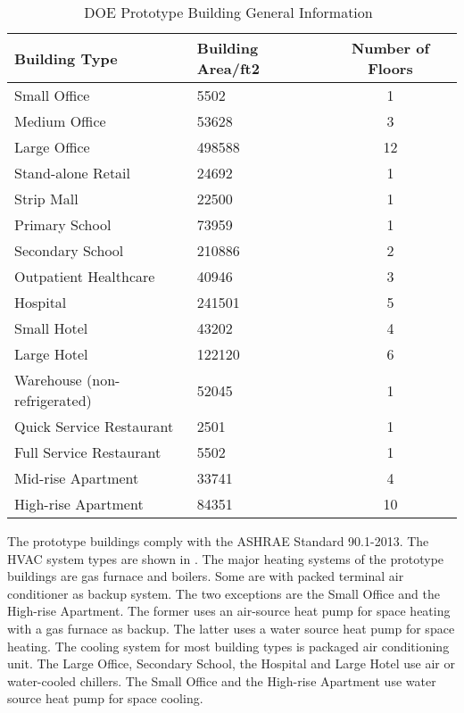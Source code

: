 \begin{table}[h!]
  \centering
  \begin{tabular}{l|l|c}
    \hline
Building Type                & Building Area/ft2 & Number of Floors\\
    \hline
Small Office                 & 5502              & 1\\
Medium Office                & 53628             & 3\\
Large Office                 & 498588            & 12\\
Stand-alone Retail           & 24692             & 1\\
Strip Mall                   & 22500             & 1\\
Primary School               & 73959             & 1\\
Secondary School             & 210886            & 2\\
Outpatient Healthcare        & 40946             & 3\\
Hospital                     & 241501            & 5\\
Small Hotel                  & 43202             & 4\\
Large Hotel                  & 122120            & 6\\
Warehouse (non-refrigerated) & 52045             & 1\\
Quick Service Restaurant     & 2501              & 1\\
Full Service Restaurant      & 5502              & 1\\
Mid-rise Apartment           & 33741             & 4\\
High-rise Apartment          & 84351             & 10\\
    \hline
\end{tabular}
\caption{DOE Prototype Building General Information~\cite{DOE2015}}
\label{tab:doeModel}
\end{table}

The prototype buildings comply with the ASHRAE Standard 90.1-2013. The
HVAC system types are shown in . The major heating
systems of the prototype buildings are gas furnace and boilers. Some
are with packed terminal air conditioner as backup system. The two
exceptions are the Small Office and the High-rise Apartment. The former uses
an air-source heat pump for space heating with a gas furnace as
backup. The latter uses a water source heat pump for space
heating. The cooling system for most building types is packaged air
conditioning unit. The Large Office, Secondary School, the Hospital and Large
Hotel use air or water-cooled chillers. The Small Office and the High-rise
Apartment use water source heat pump for space cooling.

